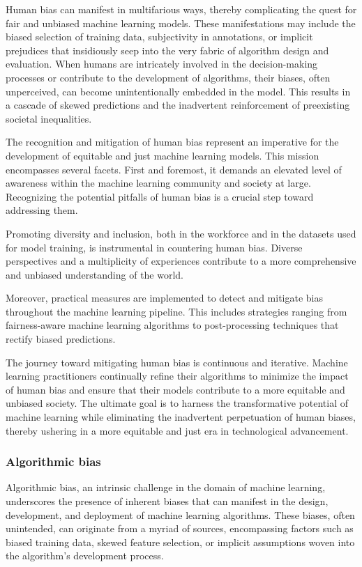 \documentclass[12pt,a4paper,openright,twoside]{book}
\begin{document}
Human bias can manifest in multifarious ways, thereby complicating the quest for fair and unbiased machine learning models. These manifestations may include the biased selection of training data, subjectivity in annotations, or implicit prejudices that insidiously seep into the very fabric of algorithm design and evaluation. When humans are intricately involved in the decision-making processes or contribute to the development of algorithms, their biases, often unperceived, can become unintentionally embedded in the model. This results in a cascade of skewed predictions and the inadvertent reinforcement of preexisting societal inequalities. \cite{https://doi.org/10.1002/widm.1356} 

The recognition and mitigation of human bias represent an imperative for the development of equitable and just machine learning models. This mission encompasses several facets. First and foremost, it demands an elevated level of awareness within the machine learning community and society at large. Recognizing the potential pitfalls of human bias is a crucial step toward addressing them. 

Promoting diversity and inclusion, both in the workforce and in the datasets used for model training, is instrumental in countering human bias. Diverse perspectives and a multiplicity of experiences contribute to a more comprehensive and unbiased understanding of the world. 

Moreover, practical measures are implemented to detect and mitigate bias throughout the machine learning pipeline. This includes strategies ranging from fairness-aware machine learning algorithms to post-processing techniques that rectify biased predictions. 

The journey toward mitigating human bias is continuous and iterative. Machine learning practitioners continually refine their algorithms to minimize the impact of human bias and ensure that their models contribute to a more equitable and unbiased society. The ultimate goal is to harness the transformative potential of machine learning while eliminating the inadvertent perpetuation of human biases, thereby ushering in a more equitable and just era in technological advancement.

\subsubsection{Algorithmic bias}

Algorithmic bias, an intrinsic challenge in the domain of machine learning, underscores the presence of inherent biases that can manifest in the design, development, and deployment of machine learning algorithms. These biases, often unintended, can originate from a myriad of sources, encompassing factors such as biased training data, skewed feature selection, or implicit assumptions woven into the algorithm's development process. 
\end{document}
